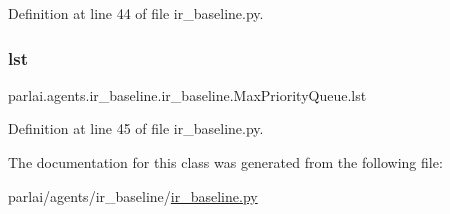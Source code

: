 Definition at line 44 of file ir\+\_\+baseline.\+py.

\mbox{\label{classparlai_1_1agents_1_1ir__baseline_1_1ir__baseline_1_1MaxPriorityQueue_a9e5cc3e3c70101f251f2d19cf936aa4e}} 
\subsubsection{\texorpdfstring{lst}{lst}}
{\footnotesize\ttfamily parlai.\+agents.\+ir\+\_\+baseline.\+ir\+\_\+baseline.\+Max\+Priority\+Queue.\+lst}



Definition at line 45 of file ir\+\_\+baseline.\+py.



The documentation for this class was generated from the following file\+:\begin{DoxyCompactItemize}
\item 
parlai/agents/ir\+\_\+baseline/\hyperlink{ir__baseline_8py}{ir\+\_\+baseline.\+py}\end{DoxyCompactItemize}
